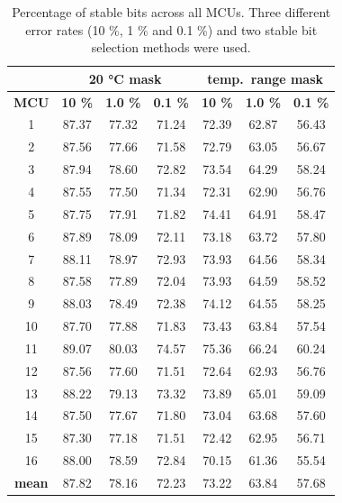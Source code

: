 \begin{table}[ht!]
    \centering
    \begin{tabular}{c||ccc|ccc}
        \multicolumn{1}{c}{} & \multicolumn{3}{c}{\textbf{20 °C mask}} & \multicolumn{3}{c}{\textbf{temp.\ range mask}} \\
    \toprule
    \textbf{MCU} &  \textbf{10 \%} &  \textbf{1.0 \%} &  \textbf{0.1 \%} &  \textbf{10 \%} &  \textbf{1.0 \%} &  \textbf{0.1 \%} \\
    \midrule
    1    &   87.37 &  77.32 &  71.24 &    72.39 &   62.87 &   56.43 \\
    2    &   87.56 &  77.66 &  71.58 &    72.79 &   63.05 &   56.67 \\
    3    &   87.94 &  78.60 &  72.82 &    73.54 &   64.29 &   58.24 \\
    4    &   87.55 &  77.50 &  71.34 &    72.31 &   62.90 &   56.76 \\
    5    &   87.75 &  77.91 &  71.82 &    74.41 &   64.91 &   58.47 \\
    6    &   87.89 &  78.09 &  72.11 &    73.18 &   63.72 &   57.80 \\
    7    &   88.11 &  78.97 &  72.93 &    73.93 &   64.56 &   58.34 \\
    8    &   87.58 &  77.89 &  72.04 &    73.93 &   64.59 &   58.52 \\
    9    &   88.03 &  78.49 &  72.38 &    74.12 &   64.55 &   58.25 \\
    10   &   87.70 &  77.88 &  71.83 &    73.43 &   63.84 &   57.54 \\
    11   &   89.07 &  80.03 &  74.57 &    75.36 &   66.24 &   60.24 \\
    12   &   87.56 &  77.60 &  71.51 &    72.64 &   62.93 &   56.76 \\
    13   &   88.22 &  79.13 &  73.32 &    73.89 &   65.01 &   59.09 \\
    14   &   87.50 &  77.67 &  71.80 &    73.04 &   63.68 &   57.60 \\
    15   &   87.30 &  77.18 &  71.51 &    72.42 &   62.95 &   56.71 \\
    16   &   88.00 &  78.59 &  72.84 &    70.15 &   61.36 &   55.54 \\
    \textbf{mean} &   87.82 &  78.16 &  72.23 &    73.22 &   63.84 &   57.68 \\
    \bottomrule
    \end{tabular}
    \captionsetup{justification=centering,margin=0.5cm}
    \caption{Percentage of stable bits across all MCUs. Three different error rates (10 \%, 1 \% and 0.1 \%) and two stable bit selection methods were used.}
    \label{table:stable_bits}
    \vspace{-1.5em}
\end{table}

